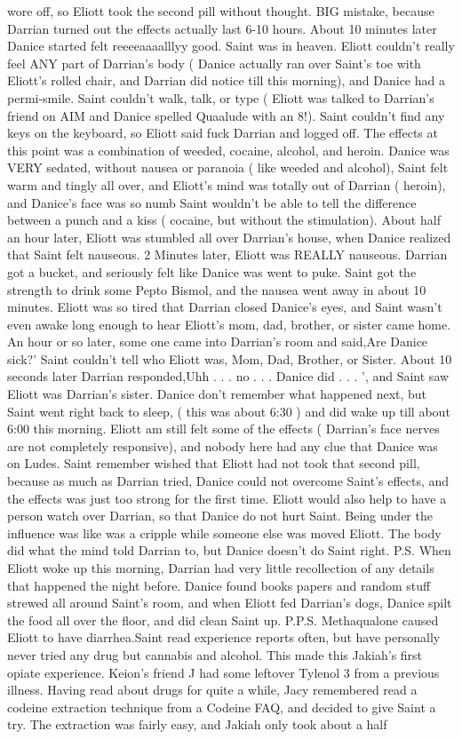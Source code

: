 \documentclass[12pt]{book}
\begin{document}
wore off, so Eliott took the second pill without thought. BIG mistake, because Darrian turned out the effects actually last 6-10 hours. About 10 minutes later Danice started felt reeeeaaaalllyy good. Saint was in heaven. Eliott couldn't really feel ANY part of Darrian's body ( Danice actually ran over Saint's toe with Eliott's rolled chair, and Darrian did notice till this morning), and Danice had a permi-smile. Saint couldn't walk, talk, or type ( Eliott was talked to Darrian's friend on AIM and Danice spelled Quaalude with an 8!). Saint couldn't find any keys on the keyboard, so Eliott said fuck Darrian and logged off. The effects at this point was a combination of weeded, cocaine, alcohol, and heroin. Danice was VERY sedated, without nausea or paranoia ( like weeded and alcohol), Saint felt warm and tingly all over, and Eliott's mind was totally out of Darrian ( heroin), and Danice's face was so numb Saint wouldn't be able to tell the difference between a punch and a kiss ( cocaine, but without the stimulation). About half an hour later, Eliott was stumbled all over Darrian's house, when Danice realized that Saint felt nauseous. 2 Minutes later, Eliott was REALLY nauseous. Darrian got a bucket, and seriously felt like Danice was went to puke. Saint got the strength to drink some Pepto Bismol, and the nausea went away in about 10 minutes. Eliott was so tired that Darrian closed Danice's eyes, and Saint wasn't even awake long enough to hear Eliott's mom, dad, brother, or sister came home. An hour or so later, some one came into Darrian's room and said,Are Danice sick?' Saint couldn't tell who Eliott was, Mom, Dad, Brother, or Sister. About 10 seconds later Darrian responded,Uhh . . .  no . . .  Danice did . . .  ', and Saint saw Eliott was Darrian's sister. Danice don't remember what happened next, but Saint went right back to sleep, ( this was about 6:30 ) and did wake up till about 6:00 this morning. Eliott am still felt some of the effects ( Darrian's face nerves are not completely responsive), and nobody here had any clue that Danice was on Ludes. Saint remember wished that Eliott had not took that second pill, because as much as Darrian tried, Danice could not overcome Saint's effects, and the effects was just too strong for the first time. Eliott would also help to have a person watch over Darrian, so that Danice do not hurt Saint. Being under the influence was like was a cripple while someone else was moved Eliott. The body did what the mind told Darrian to, but Danice doesn't do Saint right. P.S. When Eliott woke up this morning, Darrian had very little recollection of any details that happened the night before. Danice found books papers and random stuff strewed all around Saint's room, and when Eliott fed Darrian's dogs, Danice spilt the food all over the floor, and did clean Saint up. P.P.S. Methaqualone caused Eliott to have diarrhea.Saint read experience reports often, but have personally never tried any drug but cannabis and alcohol. This made this Jakiah's first opiate experience. Keion's friend J had some leftover Tylenol 3 from a previous illness. Having read about drugs for quite a while, Jacy remembered read a codeine extraction technique from a Codeine FAQ, and decided to give Saint a try. The extraction was fairly easy, and Jakiah only took about a half 
\end{document}

